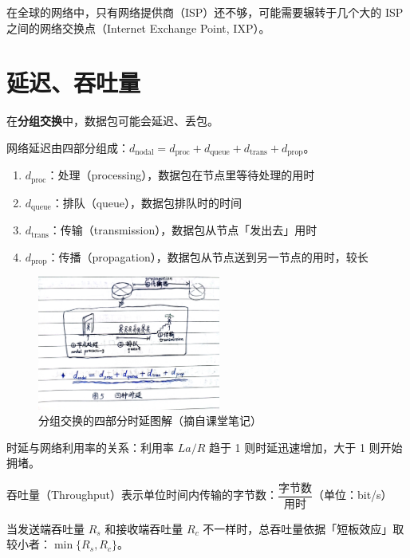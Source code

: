 \documentclass[UTF8]{ctexart}
\begin{document}
在全球的网络中，只有网络提供商（ISP）还不够，可能需要辗转于几个大的 ISP 之间的网络交换点（Internet Exchange Point, IXP）。

\section{延迟、吞吐量}
在\textbf{分组交换}中，数据包可能会延迟、丢包。

网络延迟由四部分组成：$d_{\text{nodal}} = d_{\text{proc}} + d_{\text{queue}} + d_{\text{trans}} + d_{\text{prop}}$。
\begin{enumerate}[itemsep=0pt,parsep=0pt]
  \item $d_{\text{proc}}$：处理（processing），数据包在节点里等待处理的用时
  \item $d_{\text{queue}}$：排队（queue），数据包排队时的时间
  \item $d_{\text{trans}}$：传输（transmission），数据包从节点「发出去」用时
  \item $d_{\text{prop}}$：传播（propagation），数据包从节点送到另一节点的用时，较长
\end{enumerate}

\begin{figure}[htb]
  \centering
  \includegraphics[width=6cm]{四种时延.jpg}
  \caption{分组交换的四部分时延图解（摘自课堂笔记）}\label{fig:四种时延}
\end{figure}

时延与网络利用率的关系：利用率 $La/R$ 趋于 1 则时延迅速增加，大于 1 则开始拥堵。

吞吐量（Throughput）表示单位时间内传输的字节数：$\dfrac{\text{字节数}}{\text{用时}}$（单位：bit/s）

当发送端吞吐量 $R_s$ 和接收端吞吐量 $R_c$ 不一样时，总吞吐量依据「短板效应」取较小者：$\min\{R_s,R_c\}$。
\end{document}
